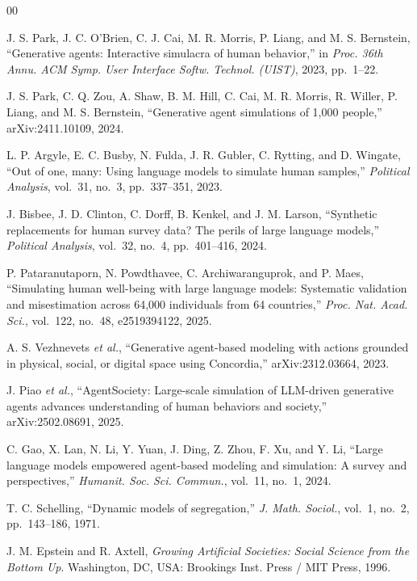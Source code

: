 \documentclass[conference]{IEEEtran}
\begin{document}
\begin{thebibliography}{00}

 J. S. Park, J. C. O'Brien, C. J. Cai, M. R. Morris, P. Liang, and M. S. Bernstein, ``Generative agents: Interactive simulacra of human behavior,'' in \emph{Proc. 36th Annu. ACM Symp. User Interface Softw. Technol. (UIST)}, 2023, pp.\ 1--22.

 J. S. Park, C. Q. Zou, A. Shaw, B. M. Hill, C. Cai, M. R. Morris, R. Willer, P. Liang, and M. S. Bernstein, ``Generative agent simulations of 1,000 people,'' arXiv:2411.10109, 2024.

 L. P. Argyle, E. C. Busby, N. Fulda, J. R. Gubler, C. Rytting, and D. Wingate, ``Out of one, many: Using language models to simulate human samples,'' \emph{Political Analysis}, vol.\ 31, no.\ 3, pp.\ 337--351, 2023.

 J. Bisbee, J. D. Clinton, C. Dorff, B. Kenkel, and J. M. Larson, ``Synthetic replacements for human survey data? The perils of large language models,'' \emph{Political Analysis}, vol.\ 32, no.\ 4, pp.\ 401--416, 2024.

 P. Pataranutaporn, N. Powdthavee, C. Archiwaranguprok, and P. Maes, ``Simulating human well-being with large language models: Systematic validation and misestimation across 64,000 individuals from 64 countries,'' \emph{Proc. Nat. Acad. Sci.}, vol.\ 122, no.\ 48, e2519394122, 2025.

 A. S. Vezhnevets \emph{et al.}, ``Generative agent-based modeling with actions grounded in physical, social, or digital space using Concordia,'' arXiv:2312.03664, 2023.

 J. Piao \emph{et al.}, ``AgentSociety: Large-scale simulation of LLM-driven generative agents advances understanding of human behaviors and society,'' arXiv:2502.08691, 2025.

 C. Gao, X. Lan, N. Li, Y. Yuan, J. Ding, Z. Zhou, F. Xu, and Y. Li, ``Large language models empowered agent-based modeling and simulation: A survey and perspectives,'' \emph{Humanit. Soc. Sci. Commun.}, vol.\ 11, no.\ 1, 2024.

 T. C. Schelling, ``Dynamic models of segregation,'' \emph{J. Math. Sociol.}, vol.\ 1, no.\ 2, pp.\ 143--186, 1971.

 J. M. Epstein and R. Axtell, \emph{Growing Artificial Societies: Social Science from the Bottom Up}. Washington, DC, USA: Brookings Inst. Press / MIT Press, 1996.


\end{thebibliography}
\end{document}
